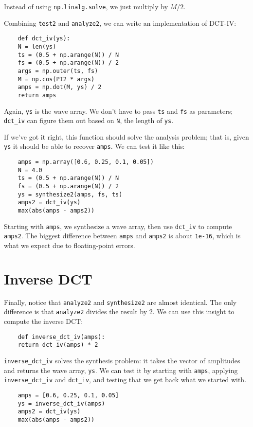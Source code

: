 Instead of using {\tt np.linalg.solve}, we just multiply
by $M/2$.

Combining {\tt test2} and {\tt analyze2}, we can write an
implementation of DCT-IV:

\begin{verbatim}
	def dct_iv(ys):
	N = len(ys)
	ts = (0.5 + np.arange(N)) / N
	fs = (0.5 + np.arange(N)) / 2
	args = np.outer(ts, fs)
	M = np.cos(PI2 * args)
	amps = np.dot(M, ys) / 2
	return amps
\end{verbatim}

Again, {\tt ys} is the wave array.  We don't have to pass
{\tt ts} and {\tt fs} as parameters; \verb"dct_iv" can
figure them out based on {\tt N}, the length of {\tt ys}.

If we've got it right, this function should solve the analysis
problem; that is, given {\tt ys} it should be able to recover
{\tt amps}.  We can test it like this:

\begin{verbatim}
	amps = np.array([0.6, 0.25, 0.1, 0.05])
	N = 4.0
	ts = (0.5 + np.arange(N)) / N
	fs = (0.5 + np.arange(N)) / 2
	ys = synthesize2(amps, fs, ts)
	amps2 = dct_iv(ys)
	max(abs(amps - amps2))
\end{verbatim}

Starting with {\tt amps}, we synthesize a wave array, then use
\verb"dct_iv" to compute {\tt amps2}.  The biggest
difference between {\tt amps} and {\tt amps2} is about {\tt 1e-16},
which is what we expect due to floating-point errors.


\section{Inverse DCT}

Finally, notice that {\tt analyze2} and {\tt synthesize2} are almost
identical.  The only difference is that {\tt analyze2} divides the
result by 2.  We can use this insight to compute the inverse DCT:

\begin{verbatim}
	def inverse_dct_iv(amps):
	return dct_iv(amps) * 2
\end{verbatim}

\verb"inverse_dct_iv" solves the synthesis problem: it
takes the vector of amplitudes and returns
the wave array, {\tt ys}.  We can test it by starting
with {\tt amps}, applying \verb"inverse_dct_iv" and \verb"dct_iv",
and testing that we get back what we started with.

\begin{verbatim}
	amps = [0.6, 0.25, 0.1, 0.05]
	ys = inverse_dct_iv(amps)
	amps2 = dct_iv(ys)
	max(abs(amps - amps2))
\end{verbatim}

